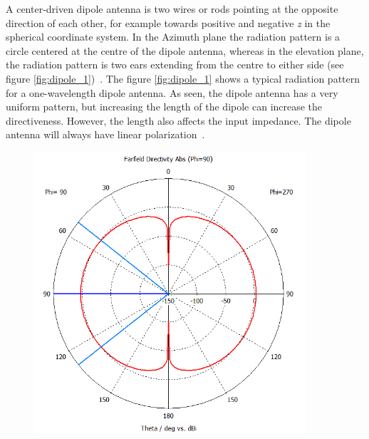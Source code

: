 A center-driven dipole antenna is two wires or rods pointing at the opposite direction of each other, for example towards positive and negative \textit{z} in the spherical coordinate system. In the Azimuth plane the radiation pattern is a circle centered at the centre of the dipole antenna, whereas in the elevation plane, the radiation pattern is two ears extending from the centre to either side (see figure \ref{fig:dipole_1})~\cite[pp. 12-14]{ant_beam_form}. The figure \ref{fig:dipole_1} shows a typical radiation pattern for a one-wavelength dipole antenna. As seen, the dipole antenna has a very uniform pattern, but increasing the length of the dipole can increase the directiveness. However, the length also affects the input impedance. The dipole antenna will always have linear polarization~\cite{dipole}. 
\begin{figure}[H]
    \begin{minipage}{0.45\textwidth}
        \centering
        \includegraphics[width=0.9\textwidth]{figures/farfield (f=2.4) dipole.png} %
    \end{minipage}\hfill
    \begin{minipage}{0.45\textwidth}
        \centering

\end{minipage}
\end{figure}
